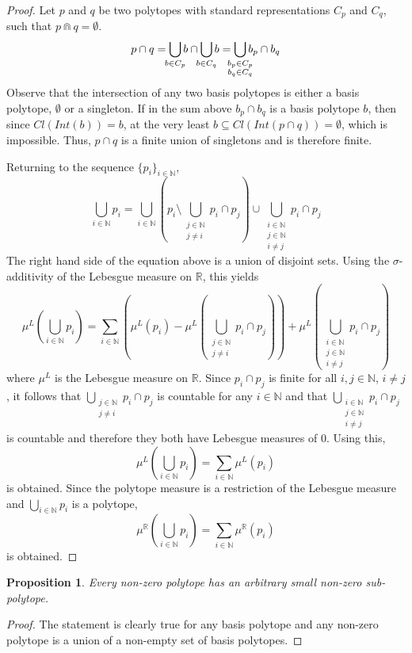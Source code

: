 \documentclass{article}
\newtheorem*{proposition}{Proposition}
\newcommand{\R}{\mathbb{R}}
\newcommand{\N}{\mathbb{N}}
\newcommand{\bcap}{\Cap}
\begin{document}
\begin{proof}
  Let $p$ and $q$ be two polytopes with standard representations $C_p$ and $C_q$, such that $p \bcap q = \emptyset$.
  \[p \cap q = \bigcup_{\mathclap{b \in C_p}}b \cap \bigcup_{\mathclap{b \in C_q}}b = \bigcup_{\mathclap{\substack{b_p \in C_p\\b_q \in C_q}}}b_p \cap b_q\]
  Observe that the intersection of any two basis polytopes is either a basis polytope, $\emptyset$ or a singleton. If in the sum above $b_p \cap b_q$ is a basis polytope $b$, then since $Cl(Int(b)) = b$, at the very least $b \subseteq Cl(Int(p \cap q)) = \emptyset$, which is impossible. Thus, $p \cap q$ is a finite union of singletons and is therefore finite.

  Returning to the sequence $\{p_i\}_{i \in \N}$,
  \[
  \bigcup_{i \in \N}p_i = \bigcup_{i \in \N}\left(p_i \setminus \bigcup_{\substack{j \in \N\\j \neq i}}p_i \cap p_j \right) \cup \bigcup_{\substack{i \in \N \\ j \in \N\\i \neq j}}p_i \cap p_j
  \]
  The right hand side of the equation above is a union of disjoint sets. Using the $\sigma$-additivity of the Lebesgue measure on $\R$, this yields
  \[
  \mu^L\left(\bigcup_{i \in \N}p_i\right) = \sum_{i \in \N}\left(\mu^L(p_i) - \mu^L\left(\bigcup_{\substack{j \in \N\\j \neq i}}p_i \cap p_j\right) \right) + \mu^L\left(\bigcup_{\substack{i \in \N \\ j \in \N\\i \neq j}}p_i \cap p_j\right)
  \]
  where $\mu^L$ is the Lebesgue measure on $\R$. Since $p_i \cap p_j$ is finite for all $i,j \in \N$, $i \neq j$, it follows that $\bigcup_{\substack{j \in \N\\j \neq i}}p_i \cap p_j$ is countable for any $i \in \N$ and that $\bigcup_{\substack{i \in \N \\ j \in \N\\i \neq j}}p_i \cap p_j$ is countable and therefore they both have Lebesgue measures of $0$. Using this,
  \[
  \mu^L\left(\bigcup_{i \in \N}p_i\right) = \sum_{i \in \N}\mu^L(p_i)
  \]
  is obtained. Since the polytope measure is a restriction of the Lebesgue measure and $\bigcup_{i \in \N}p_i$ is a polytope,
  \[
  \mu^\R\left(\bigcup_{i \in \N}p_i\right) = \sum_{i \in \N}\mu^\R(p_i)
  \]
  is obtained.
\end{proof}

\begin{proposition}
 Every non-zero polytope has an arbitrary small non-zero sub-polytope.
\end{proposition}
\begin{proof}
The statement is clearly true for any basis polytope and any non-zero polytope is a union of a non-empty set of basis polytopes.
\end{proof}
\end{document}

